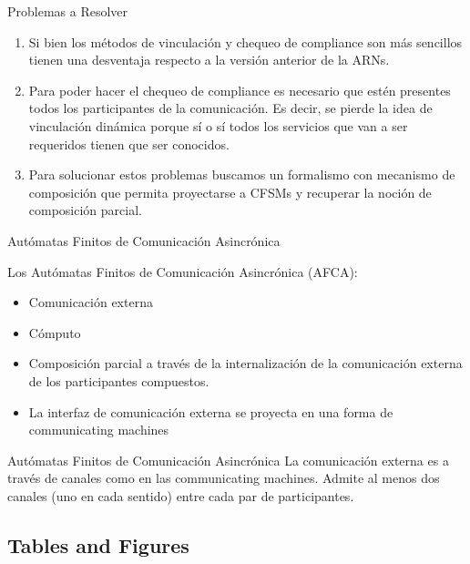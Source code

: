 \documentclass[10pt,xcolor={table,dvipsnames},t]{beamer}
\begin{document}
\begin{frame}{Problemas a Resolver}
\begin{enumerate}
    \item Si bien los métodos de vinculación y chequeo de compliance son más sencillos tienen una desventaja respecto a la versión anterior de la ARNs. \\
    \item Para poder hacer el chequeo de compliance es necesario que estén presentes todos los participantes de la comunicación. Es decir, se pierde la idea de vinculación dinámica porque sí o sí todos los servicios que van a ser requeridos tienen que ser conocidos.\\
    \item Para solucionar estos problemas buscamos un formalismo con mecanismo de composición que permita proyectarse a CFSMs y recuperar la noción de composición parcial.

\end{enumerate}
\end{frame}

\begin{frame}{Autómatas Finitos de Comunicación Asincrónica}

Los Autómatas Finitos de Comunicación Asincrónica (AFCA):
\begin{itemize}
    \item Comunicación externa
    \item Cómputo 
    \item Composición parcial a través de la internalización de la comunicación externa de los participantes compuestos. 
    \item La interfaz de comunicación externa se proyecta en una forma de communicating machines

\end{itemize}
    
\end{frame}

\begin{frame}{Autómatas Finitos de Comunicación Asincrónica}
La comunicación externa es a través de canales como en las communicating machines. Admite al menos dos canales (uno en cada sentido) entre cada par de participantes.

    
\end{frame}

\subsection{Tables and Figures}
\end{document}

